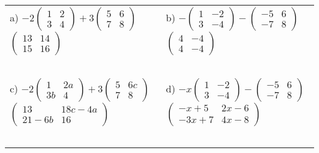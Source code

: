 \documentclass[fontsize=12pt]{scrartcl}
\begin{document}
\begin{tabular}{p{9cm}p{9cm}}
a) $-2\begin{pmatrix}1&2\\3&4 \end{pmatrix}+3\begin{pmatrix}5&6\\7&8 \end{pmatrix}$
 \quad $\begin{pmatrix}13&14\\15&16\end{pmatrix}$
&b) $-\begin{pmatrix}1&-2\\3&-4 \end{pmatrix}-\begin{pmatrix}-5&6\\-7&8 \end{pmatrix}$
 \quad $\begin{pmatrix}4&-4\\4&-4\end{pmatrix}$
\\\\\\
\\\\\\

c) $-2\begin{pmatrix}1&2a\\3b&4 \end{pmatrix}+3\begin{pmatrix}5&6c\\7&8 \end{pmatrix}$
 \quad $\begin{pmatrix}13&18c-4a\\21-6b&16\end{pmatrix}$
&d) $-x\begin{pmatrix}1&-2\\3&-4 \end{pmatrix}-\begin{pmatrix}-5&6\\-7&8 \end{pmatrix}$
 \quad $\begin{pmatrix}-x+5&2x-6\\-3x+7&4x-8\end{pmatrix}$
\\\\\\
\\\\\\


\end{tabular}
\end{document}
